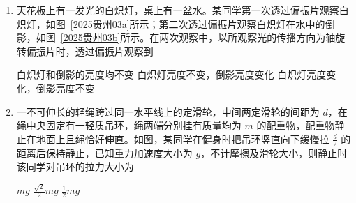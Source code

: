 \documentclass[\gkver]{gaokaozhenti}
\begin{document}
\begin{enumerate}
{根据动量守恒定律，甲、乙系统总动量守恒，乙与甲动量变化大小相等，乙的初动量为零，则刚分开时，乙的动量大小为 $\frac{2}{3}p_{0}$，所以甲、乙的动量大小之比为 1:2。

故选 C。
}

\item
天花板上有一发光的白炽灯，桌上有一盆水。某同学第一次透过偏振片观察白炽灯，如图~\ref{2025贵州03a}所示；第二次透过偏振片观察白炽灯在水中的倒影，如图~\ref{2025贵州03b}所示。在两次观察中，以所观察光的传播方向为轴旋转偏振片时，透过偏振片观察到


{白炽灯和倒影的亮度均不变}
{白炽灯亮度不变，倒影亮度变化}
{白炽灯亮度变化，倒影亮度不变}


\item
一不可伸长的轻绳跨过同一水平线上的定滑轮，中间两定滑轮的间距为 $d$，在绳中央固定有一轻质吊环，绳两端分别挂有质量均为 $m$ 的配重物，配重物静止在地面上且绳恰好伸直。如图，某同学在健身时把吊环竖直向下缓慢拉 $\frac{d}{2}$ 的距离后保持静止，已知重力加速度大小为 $g$，不计摩擦及滑轮大小，则静止时该同学对吊环的拉力大小为


{$mg$}
{$\frac{\sqrt 2}{2}mg$}
{$\frac{1}{2}mg$}

\end{enumerate}
\end{document}
